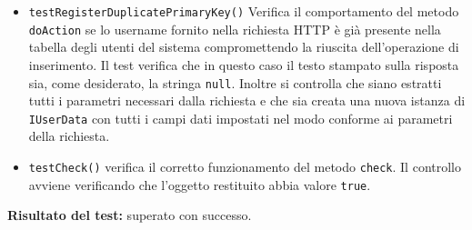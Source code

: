 \begin{itemize}
\begin{itemize}
\item \texttt{testRegisterDuplicatePrimaryKey()}
Verifica il comportamento del metodo \texttt{doAction} se lo username fornito nella richiesta HTTP è già presente nella tabella degli utenti del sistema compromettendo la riuscita dell'operazione di inserimento. Il test verifica che in questo caso il testo stampato sulla risposta sia, come desiderato, la stringa \texttt{null}. Inoltre si controlla che siano estratti tutti i parametri necessari dalla richiesta e che sia creata una nuova istanza di \texttt{IUserData} con tutti i campi dati impostati nel modo conforme ai parametri della richiesta.

\item \texttt{testCheck()} verifica il corretto funzionamento del metodo \texttt{check}. Il controllo avviene verificando che l'oggetto restituito abbia valore \texttt{true}.
 
\end{itemize}

\textbf{Risultato del test:} superato con successo.

\end{itemize}

